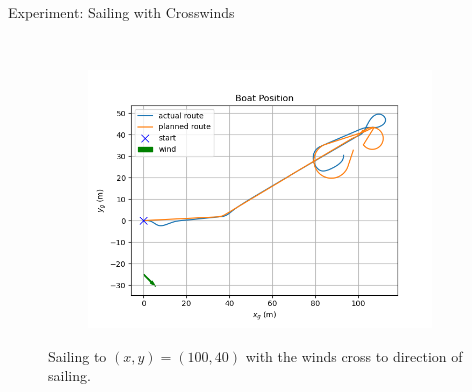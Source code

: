 \documentclass[10pt,xcolor={table,dvipsnames},t]{beamer}
\begin{document}
\begin{frame}{Experiment: Sailing with Crosswinds}
\begin{figure}
\begin{subfigure}[b]{0.35\textwidth}
         \label{fig:right_wind_speed}
     \end{subfigure}
     \hfill\\
     \begin{subfigure}[b]{0.4\textwidth}
         \centering
         \includegraphics[width=\textwidth,trim={0.5cm 0.25cm 1.25cm 0.75cm },clip]{documents/final_pres_figs/right_to_wind_to_40_40_pos.png}
         \label{fig:right_wind_pos}
     \end{subfigure}
    \caption{Sailing to \((x,y)=(100,40)\) with the winds cross to direction of sailing.}
    \label{fig:rstarst}
\end{figure}
\end{frame}
\end{document}
